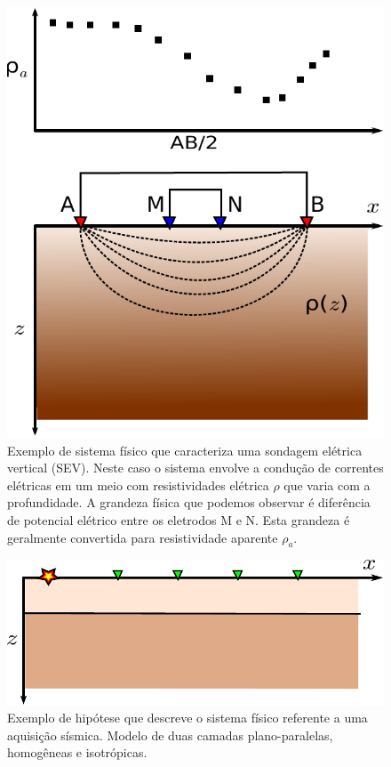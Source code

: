 \begin{figure}
    \centering
    \includegraphics[scale=0.7]{figs/system-sev}
    \caption{Exemplo de sistema físico que caracteriza uma sondagem elétrica
        vertical (SEV). Neste caso o sistema envolve a condução de correntes
        elétricas em um meio com resistividades elétrica $\rho$ que varia com
        a profundidade.
        A grandeza física que podemos observar é diferência de potencial
        elétrico entre os eletrodos M e N. Esta grandeza é geralmente convertida
        para resistividade aparente $\rho_a$.}
    \label{fig:system-sev}
\end{figure}

\begin{figure}
    \centering
    \includegraphics[scale=0.7]{figs/hipotese-seismic}
    \caption{Exemplo de hipótese que descreve o sistema físico referente a uma
    aquisição sísmica. Modelo de duas camadas plano-paralelas, homogêneas e
    isotrópicas.}
    \label{fig:hipotese-seismic}
\end{figure}

